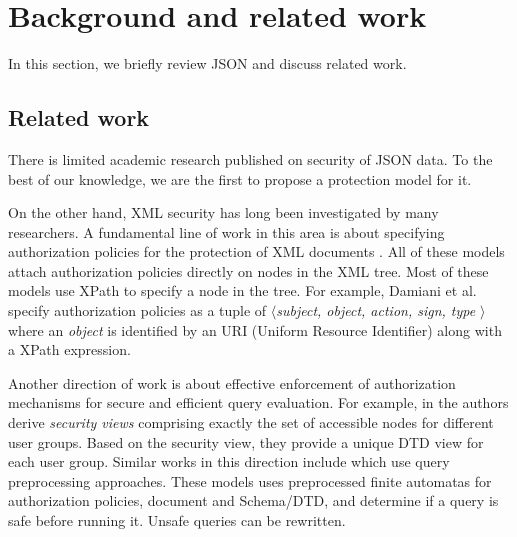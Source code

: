 \section{Background and related work}
\label{sec:related-work}

In this section, we briefly review JSON and discuss related work.




\subsection{Related work}

There is limited academic research published  on security of  JSON data. To the best of our knowledge, we are the first to propose a protection model for it.

On the other hand, XML security has long been investigated by many researchers. A fundamental line of work in this area is about specifying authorization policies for the protection of XML documents \cite{policy-based4,policy-based2,policy-based5,policy-based6}. All of these models attach authorization policies directly on nodes in the XML tree. Most of these models use XPath \cite{Xpath} to specify a node in the tree. For example, Damiani et al. \cite{damiani2002fine} specify authorization policies as a tuple of $\langle$\textit{subject, object, action, sign, type} $\rangle$ where  an \textit{object} is identified by an URI (Uniform Resource Identifier) along with a XPath  expression.


Another direction of work is about effective enforcement of authorization mechanisms  for secure and efficient query evaluation. For example, in \cite{xml-view1} the authors derive \textit{security views} comprising exactly the set of accessible nodes for different user groups. Based on the security view, they  provide a unique DTD view for each user group. Similar works in this direction include  \cite{xml-performance2,xml-performance1} which use query preprocessing approaches. These models uses preprocessed finite automatas for authorization policies, document and Schema/DTD, and determine if a query is safe before running it. Unsafe queries can be rewritten.

